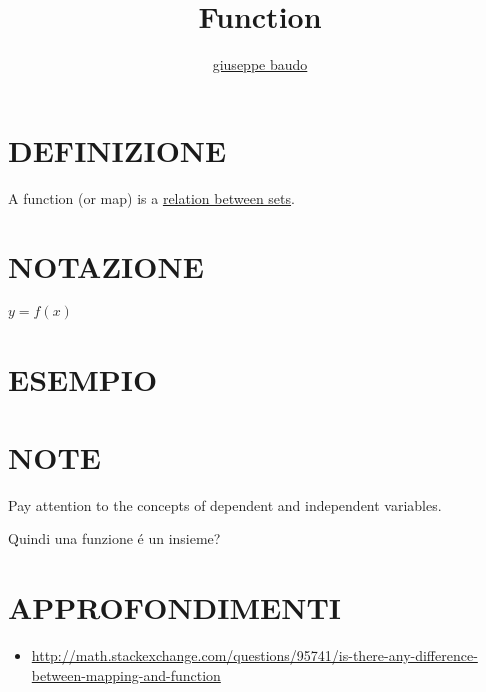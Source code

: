 \documentclass[a4paper,10pt]{article}
\title{Function}
\author{\href{http://www.baudo.hol.es}{giuseppe baudo}}
\begin{document}
\maketitle

\section{DEFINIZIONE}
A function (or map) is a \href{Relation.html}{relation between sets}.

\section{NOTAZIONE}
$y=f(x)$

\section{ESEMPIO}

\section{NOTE}
Pay attention to the concepts of dependent and independent variables.

Quindi una funzione \'{e} un insieme?

\section{APPROFONDIMENTI}
\begin{itemize}
 \item \url{http://math.stackexchange.com/questions/95741/is-there-any-difference-between-mapping-and-function}
\end{itemize}
\end{document}
